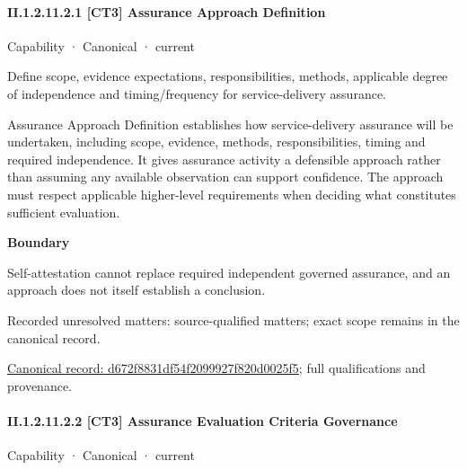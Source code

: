 \paragraph*{II.1.2.11.2.1 [CT3] Assurance Approach Definition}
\label{navigation:II.1.2.11.2.1}

\label{element:d672f8831df54f2099927f820d0025f5}
{\small Capability · Canonical · current}\par

Define scope, evidence expectations, responsibilities, methods, applicable degree of independence and timing/frequency for service-delivery assurance.



Assurance Approach Definition establishes how service-delivery assurance will be undertaken, including scope, evidence, methods, responsibilities, timing and required independence. It gives assurance activity a defensible approach rather than assuming any available observation can support confidence. The approach must respect applicable higher-level requirements when deciding what constitutes sufficient evaluation.



\textbf{Boundary}



Self-attestation cannot replace required independent governed assurance, and an approach does not itself establish a conclusion.


{\small Recorded unresolved matters: source-qualified matters; exact scope remains in the canonical record.}\par
{\footnotesize \href{../../../../../../../continuum/strategy/capability/d672f8831df54f2099927f820d0025f5.md}{Canonical record: d672f8831df54f2099927f820d0025f5}; full qualifications and provenance.}\par
\paragraph*{II.1.2.11.2.2 [CT3] Assurance Evaluation Criteria Governance}
\label{navigation:II.1.2.11.2.2}

\label{element:f3e32f2a2c9d47a89eaf124647161522}
{\small Capability · Canonical · current}\par

